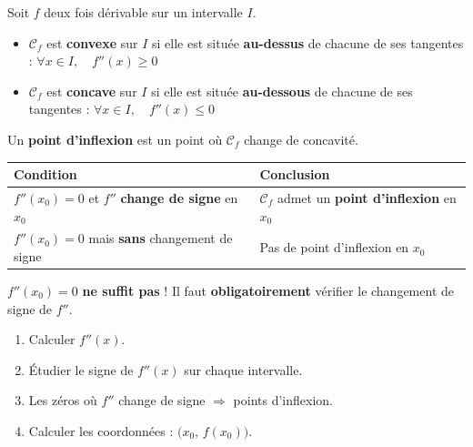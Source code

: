 \begin{definition}
  Soit $f$ deux fois d\'{e}rivable sur un intervalle $I$.
  \begin{itemize}
    \item $\mathcal{C}_f$ est \textbf{convexe} sur $I$ si elle est situ\'{e}e
          \textbf{au-dessus} de chacune de ses tangentes :
          \( \forall x \in I,\quad f''(x) \geq 0 \)
    \item $\mathcal{C}_f$ est \textbf{concave} sur $I$ si elle est situ\'{e}e
          \textbf{au-dessous} de chacune de ses tangentes :
          \( \forall x \in I,\quad f''(x) \leq 0 \)
  \end{itemize}
\end{definition}

\begin{definition}
  Un \textbf{point d'inflexion} est un point o\`{u} $\mathcal{C}_f$
  change de concavit\'{e}.

  \medskip
  \begin{center}
  \renewcommand{\arraystretch}{1.8}
  \begin{tabular}{|p{6.5cm}|p{6.5cm}|}
    \hline
    \textbf{\color{navy}Condition}
      & \textbf{\color{navy}Conclusion} \\
    \hline\hline
    $f''(x_0) = 0$ et $f''$ \textbf{change de signe} en $x_0$
      & $\mathcal{C}_f$ admet un \textbf{point d'inflexion} en $x_0$ \\
    \hline
    $f''(x_0) = 0$ mais \textbf{sans} changement de signe
      & Pas de point d'inflexion en $x_0$ \\
    \hline
  \end{tabular}
  \end{center}
\end{definition}

\begin{attention}
  $f''(x_0) = 0$ \textbf{ne suffit pas} !
  Il faut \textbf{obligatoirement} v\'{e}rifier le changement de signe de $f''$.
\end{attention}

\begin{methode}
  \begin{enumerate}
    \item Calculer $f''(x)$.
    \item \'{E}tudier le signe de $f''(x)$ sur chaque intervalle.
    \item Les z\'{e}ros o\`{u} $f''$ change de signe $\Rightarrow$ points d'inflexion.
    \item Calculer les coordonn\'{e}es : $\bigl(x_0,\, f(x_0)\bigr)$.
  \end{enumerate}
\end{methode}

